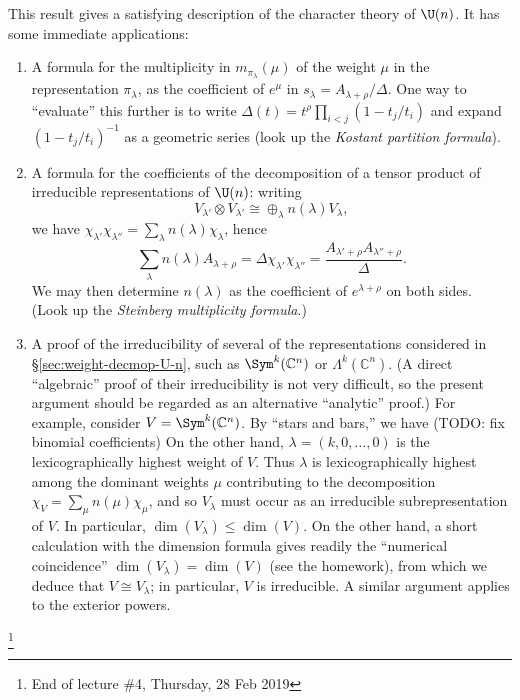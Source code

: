 \documentclass[reqno]{amsart} 
\begin{document}
This result gives a satisfying description of the character theory of $\U(n)$.  It has some immediate applications:
\begin{enumerate}
\item A formula for the multiplicity in $m_{\pi_\lambda}(\mu)$ of the weight $\mu$ in the representation $\pi_\lambda$, as the coefficient of $e^\mu$ in $s_\lambda = A_{\lambda + \rho}/\Delta$.  One way to ``evaluate'' this further is to write $\Delta(t) = t^\rho \prod_{i < j} (1 - t_j/t_i)$ and expand $(1 - t_j/t_i)^{-1}$ as a geometric series (look up the \emph{Kostant partition formula}).
\item A formula for the coefficients of the decomposition of a tensor product of irreducible representations of $\U(n)$: writing
  \begin{equation}\label{eq:}
    V_{\lambda '}
    \otimes V_{\lambda '}
    \cong \oplus_{\lambda}
    n(\lambda) V_{\lambda},
  \end{equation}
  we have $\chi_{\lambda '} \chi_{\lambda ''} = \sum_{\lambda} n(\lambda) \chi_\lambda$, hence
  \begin{equation*}
    \sum_{\lambda} n(\lambda) A_{\lambda+\rho} = \Delta \chi_{\lambda '} \chi_{\lambda ''} = \frac{A_{\lambda ' + \rho} A_{\lambda '' + \rho}}{\Delta }.
  \end{equation*}
  We may then determine $n(\lambda)$ as the coefficient of $e^{\lambda+\rho}$ on both sides.  (Look up the \emph{Steinberg multiplicity formula}.)
\item A proof of the irreducibility of several of the representations considered in \S\ref{sec:weight-decmop-U-n}, such as $\Sym^k(\mathbb{C}^n)$ or $\Lambda^k(\mathbb{C}^n)$.  (A direct ``algebraic'' proof of their irreducibility is not very difficult, so the present argument should be regarded as an alternative ``analytic'' proof.)  For example, consider $V = \Sym^k(\mathbb{C}^n)$.  By ``stars and bars,'' we have (TODO: fix binomial coefficients)
  On the other hand, $\lambda = (k,0,\dotsc,0)$ is the lexicographically highest weight of $V$.  Thus $\lambda$ is lexicographically highest among the dominant weights $\mu$ contributing to the decomposition $\chi_V = \sum_{\mu} n(\mu) \chi_\mu$, and so $V_\lambda$ must occur as an irreducible subrepresentation of $V$.  In particular, $\dim(V_\lambda) \leq \dim(V)$.  On the other hand, a short calculation with the dimension formula gives readily the ``numerical coincidence'' $\dim(V_\lambda) = \dim(V)$ (see the homework), from which we deduce that $V \cong V_\lambda$; in particular, $V$ is irreducible.  A similar argument applies to the exterior powers.
\end{enumerate}
\footnote{End of lecture \#4, Thursday, 28 Feb 2019}
\end{document}
